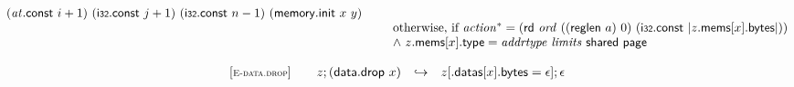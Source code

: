 $$\begin{array}[t]{@{}lrcl@{}l@{}}
\begin{array}[t]{@{}l@{}}
  ({\mathit{at}}{.}\mathsf{const}~i + 1)~(\mathsf{i{\scriptstyle 32}}{.}\mathsf{const}~j + 1)~(\mathsf{i{\scriptstyle 32}}{.}\mathsf{const}~n - 1)~(\mathsf{memory{.}init}~x~y) \end{array} &  \\
& \multicolumn{4}{@{}l@{}}{\quad
\quad
\begin{array}[t]{@{}l@{}}
\mbox{otherwise, if}~ {{\mathit{action}}^\ast} = (\mathsf{rd}~{\mathit{ord}}~((\mathsf{reglen}~a)~0)~(\mathsf{i{\scriptstyle 32}}{.}\mathsf{const}~{|z{.}\mathsf{mems}{}[x]{.}\mathsf{bytes}|})) \\
{\land}~ z{.}\mathsf{mems}{}[x]{.}\mathsf{type} = {\mathit{addrtype}}~{\mathit{limits}}~\mathsf{shared}~\mathsf{page} \\
\end{array}
} \\
\end{array}
$$

$$
\begin{array}[t]{@{}lrcl@{}l@{}}
{[\textsc{\scriptsize E{-}data.drop}]} \quad & z ; (\mathsf{data{.}drop}~x) & \hookrightarrow & z{}[{.}\mathsf{datas}{}[x]{.}\mathsf{bytes} = \epsilon] ; \epsilon \\
\end{array}
$$

\vspace{1ex}

